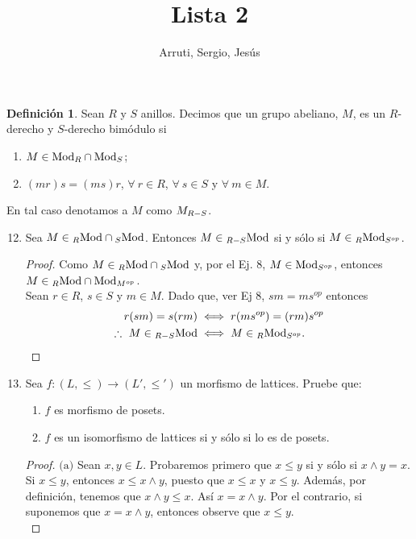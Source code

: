 \documentclass{article}
\title{Lista 2}
\author{Arruti, Sergio, Jesús}
\date{}
\newcommand{\lrprth}[1]{
	\left(#1\right)
}
\newcommand{\opst}[1]{
	{#1}^{op}
}
\newcommand{\ringmod}[3]{
	\if#3l
	{}_{#1}#2
	\else
	\if#3r
	#2_{#1}
	\fi
	\fi
}
\newcommand{\ringbimod}[4]{
	\if#4l
	{}_{#1-#2}#3
	\else
	\if#4r
	#3_{#1-#2}
	\else 
	\ifstrequal{#4}{lr}{
		{}_{#1}#3_{#2}
	}
	\fi
	\fi
}
\theoremstyle{definition}
\newtheorem{define}{Definición}
\theoremstyle{plain}
\theoremstyle{plain}
\theoremstyle{definition}
\theoremstyle{definition}
\theoremstyle{definition}
\theoremstyle{definition}
\theoremstyle{definition}
\theoremstyle{definition}
\begin{document}
	
	\maketitle
\begin{define}
	Sean $R$ y $S$ anillos. Decimos que un grupo abeliano, $M$, es un $R$-derecho y $S$-derecho bimódulo si
	\begin{enumerate}[label=\roman*)]
		\item $M\in\ringmod{R}{\text{Mod}}{r}\cap\ringmod{S}{\text{Mod}}{r}$;
		\item $(mr)s=(ms)r$, $\forall\ r\in R$, $\forall\ s\in S$ y $\forall\ m\in M$.
	\end{enumerate}
	En tal caso denotamos a $M$ como $\ringbimod{R}{S}{M}{r}$.
\end{define}
	\begin{enumerate}[label=\textbf{Ej \arabic*.}]
		\setcounter{enumi}{11}
\item Sea $M\in\ringmod{R}{\text{Mod}}{l}\cap\ringmod{S}{\text{Mod}}{l}$. Entonces $M\in\ringbimod{R}{S}{\text{Mod}}{l}$ si y sólo si $M\in\ringbimod{R}{\opst{S}}{\text{Mod}}{lr}$.
\begin{proof}
	Como $M\in\ringmod{R}{\text{Mod}}{l}\cap\ringmod{S}{\text{Mod}}{l}$ y, por el Ej. 8, $M\in\ringmod{\opst{S}}{\text{Mod}}{r}$, entonces $M\in\ringmod{R}{\text{Mod}}{l}\cap\ringmod{\opst{M}}{\text{Mod}}{r}$.\\ Sean $r\in R$, $s\in S$ y $m\in M$. 
	Dado que, ver Ej 8, $sm=ms^{op}$ entonces 
	\begin{align*}
		r(sm)=s(rm)&\iff r(m\opst{s})=(rm)\opst{s}\\
		\therefore\  M\in\ringbimod{R}{S}{\text{Mod}}{l}&\iff M\in\ringbimod{R}{\opst{S}}{\text{Mod}}{lr}.
	\end{align*}
\end{proof}
\item Sea $f:\lrprth{L, \leq } \longrightarrow \lrprth{L', \leq '}$ un morfismo de lattices. Pruebe que:
\begin{enumerate}
	\item $f$ es morfismo de posets.
	\item $f$ es un isomorfismo de lattices si y sólo si lo es de posets.
\end{enumerate}
\begin{proof}
	$\boxed{\text{(a)}}$ Sean $x,y \in L$. Probaremos primero que $x \leq y$ si y sólo si $x \wedge y = x$. Si $x \leq y$, entonces $x \leq x \wedge y$, puesto que $x \leq x$ y $x \leq y$. Además, por definición, tenemos que $x \wedge y \leq x$. Así $x = x \wedge y$. Por el contrario, si suponemos que $x = x \wedge y$, entonces observe que $x \leq y$.\\
	

\end{proof}
\end{enumerate}
\end{document}
